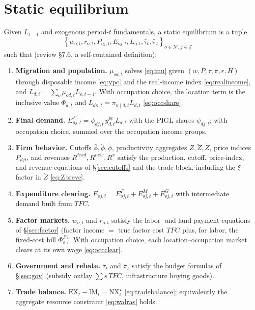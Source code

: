 \documentclass[11pt]{article}
\newcommand{\Nreg}{\mathcal{N}}
\newcommand{\Sct}{\mathcal{J}}
\begin{document}
\section{Static equilibrium}
Given $L_{t-1}$ and exogenous period-$t$ fundamentals, a static equilibrium is a tuple
\[
  \left\{
    w_{o,t}, r_{o,t}, P_{oj,t}, E_{oj,t}, L_{o,t}, \bar\tau_t, \bar\pi_t
  \right\}_{o \in \Nreg,\, j \in \Sct}
\]
such that (review \S7.6, a self-contained definition):
\begin{enumerate}[leftmargin=1.5em]
\item \textbf{Migration and population.} $\mu_{od,t}$ solves \eqref{eq:mu} given
      $(w,P,\bar\tau,\bar\pi,r,H)$ through disposable income \eqref{eq:ypc} and the
      real-income index \eqref{eq:realincome}, and $L_{d,t}=\sum_o\mu_{od,t}L_{o,t-1}$. With
      occupation choice, the location term is the inclusive value $\Phi_{d,t}$ and
      $L_{d\kappa,t}=\pi_{\kappa\mid d,t}L_{d,t}$ \eqref{eq:occshare}.
\item \textbf{Final demand.} $E^{F}_{dj,t}=\psi_{dj,t}\,y^{pc}_{d,t}L_{d,t}$ with the
      PIGL shares $\psi_{dj,t}$; with occupation choice, summed over the occupation income
      groups.
\item \textbf{Firm behavior.} Cutoffs $\bar\phi,\breve\phi,\tilde\phi$, productivity
      aggregates $Z,\breve Z,\tilde Z$, price indices $P_{djt}$, and revenues
      $R^{trad},R^{new},R^{x}$ satisfy the production, cutoff, price-index, and revenue
      equations of \S\ref{sec:cutoffs} and the trade block, including the $\xi$ factor
      in $\breve Z$ \eqref{eq:Zbreve}.
\item \textbf{Expenditure clearing.} $E_{oj,t}=E^{F}_{oj,t}+E^{M}_{oj,t}+E^{G}_{oj,t}$
      with intermediate demand built from $TFC$.
\item \textbf{Factor markets.} $w_{o,t}$ and $r_{o,t}$ satisfy the labor- and
      land-payment equations of \S\ref{sec:factor} (factor income $=$ true factor cost
      $TFC$ plus, for labor, the fixed-cost bill $\Phi^{F}_o$). With occupation choice, each
      location--occupation market clears at its own wage \eqref{eq:occclear}.
\item \textbf{Government and rebate.} $\bar\tau_t$ and $\bar\pi_t$ satisfy the budget
      formulas of \S\ref{sec:gov} (subsidy outlay $\sum s\,TFC$, infrastructure buying goods).
\item \textbf{Trade balance.} $\mathrm{EX}_t-\mathrm{IM}_t=\mathrm{NX}^{\star}_t$
      \eqref{eq:tradebalance}; equivalently the aggregate resource constraint
      \eqref{eq:walras} holds.
\end{enumerate}
\end{document}
